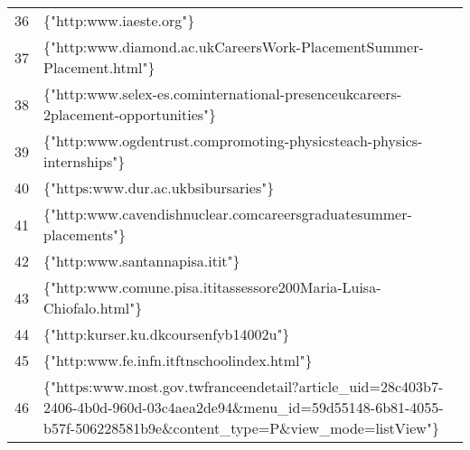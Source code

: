 \documentclass[a4paper,10pt]{article}
\begin{document}
\begin{table}[]
\begin{tabular}{ll}
36 & \{"http:\/\/www.iaeste.org"\}                                                                                                                                                              \\
37 & \{"http:\/\/www.diamond.ac.uk\/Careers\/Work-Placement\/Summer-Placement.html"\}                                                                                                           \\
38 & \{"http:\/\/www.selex-es.com\/international-presence\/uk\/careers-2\/placement-opportunities"\}                                                                                            \\
39 & \{"http:\/\/www.ogdentrust.com\/promoting-physics\/teach-physics-internships"\}                                                                                                            \\
40 & \{"https:\/\/www.dur.ac.uk\/bsi\/bursaries\/"\}                                                                                                                                            \\
41 & \{"http:\/\/www.cavendishnuclear.com\/careers\/graduate\/summer-placements\/"\}                                                                                                            \\
42 & \{"http:\/\/www.santannapisa.it\/it"\}                                                                                                                                                     \\
43 & \{"http:\/\/www.comune.pisa.it\/it\/assessore\/200\/Maria-Luisa-Chiofalo.html"\}                                                                                                           \\
44 & \{"http:\/\/kurser.ku.dk\/course\/nfyb14002u"\}                                                                                                                                            \\
45 & \{"http:\/\/www.fe.infn.it\/ftnschool\/index.html"\}                                                                                                                                       \\
46 & \{"https:\/\/www.most.gov.tw\/france\/en\/detail?article\_uid=28c403b7-2406-4b0d-960d-03c4aea2de94\&menu\_id=59d55148-6b81-4055-b57f-506228581b9e\&content\_type=P\&view\_mode=listView"\}
\end{tabular}
\end{table}
\end{document}
